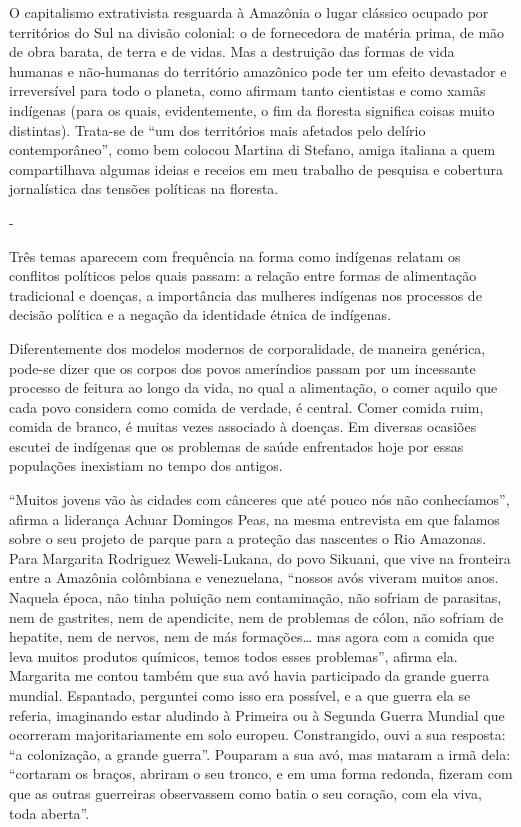 O capitalismo extrativista resguarda à Amazônia o lugar clássico ocupado
por territórios do Sul na divisão colonial: o de fornecedora de matéria
prima, de mão de obra barata, de terra e de vidas. Mas a destruição das
formas de vida humanas e não-humanas do território amazônico pode ter um
efeito devastador e irreversível para todo o planeta, como afirmam tanto
cientistas e como xamãs indígenas (para os quais, evidentemente, o fim
da floresta significa coisas muito distintas). Trata-se de ``um dos
territórios mais afetados pelo delírio contemporâneo'', como bem colocou
Martina di Stefano, amiga italiana a quem compartilhava algumas ideias e
receios em meu trabalho de pesquisa e cobertura jornalística das tensões
políticas na floresta.

-

Três temas aparecem com frequência na forma como indígenas relatam os
conflitos políticos pelos quais passam: a relação entre formas de
alimentação tradicional e doenças, a importância das mulheres indígenas
nos processos de decisão política e a negação da identidade étnica de
indígenas.

Diferentemente dos modelos modernos de corporalidade, de maneira
genérica, pode-se dizer que os corpos dos povos ameríndios passam por um
incessante processo de feitura ao longo da vida, no qual a alimentação,
o comer aquilo que cada povo considera como comida de verdade, é
central. Comer comida ruim, comida de branco, é muitas vezes associado à
doenças. Em diversas ocasiões escutei de indígenas que os problemas de
saúde enfrentados hoje por essas populações inexistiam no tempo dos
antigos.

``Muitos jovens vão às cidades com cânceres que até pouco nós não
conhecíamos'', afirma a liderança Achuar Domingos Peas, na mesma
entrevista em que falamos sobre o seu projeto de parque para a proteção
das nascentes o Rio Amazonas. Para Margarita Rodriguez Weweli-Lukana, do
povo Sikuani, que vive na fronteira entre a Amazônia colômbiana e
venezuelana, ``nossos avós viveram muitos anos. Naquela época, não tinha
poluição nem contaminação, não sofriam de parasitas, nem de gastrites,
nem de apendicite, nem de problemas de cólon, não sofriam de hepatite,
nem de nervos, nem de más formações\ldots{} mas agora com a comida que
leva muitos produtos químicos, temos todos esses problemas'', afirma
ela. Margarita me contou também que sua avó havia participado da grande
guerra mundial. Espantado, perguntei como isso era possível, e a que
guerra ela se referia, imaginando estar aludindo à Primeira ou à Segunda
Guerra Mundial que ocorreram majoritariamente em solo europeu.
Constrangido, ouvi a sua resposta: ``a colonização, a grande guerra''.
Pouparam a sua avó, mas mataram a irmã dela: ``cortaram os braços,
abriram o seu tronco, e em uma forma redonda, fizeram com que as outras
guerreiras observassem como batia o seu coração, com ela viva, toda
aberta''.

